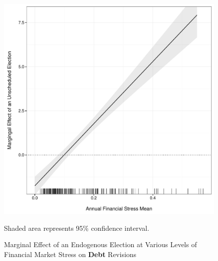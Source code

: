 \documentclass[]{article}
\begin{document}
\begin{figure}
    \caption{Marginal Effect of an Endogenous Election at Various Levels of Financial Market Stress on \textbf{Debt} Revisions}
    \label{me_finstress_endog_elect}

    \begin{center}
        \includegraphics[scale=0.4]{figures/fsi_unscheduled_debt_me.pdf}
    \end{center}

	{\scriptsize{Shaded area represents 95\% confidence interval.}}

\end{figure}
\end{document}
